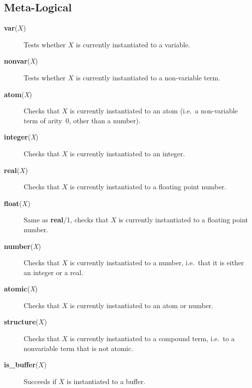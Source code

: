 \subsection{Meta-Logical}

\begin{description}

\item[{\bf var}($X$)] 
    Tests whether $X$ is currently instantiated to a variable.

\item[{\bf nonvar}({\em X})] 
    Tests whether $X$ is currently instantiated to a non-variable term.

\item[{\bf atom}({\em X})] 
    Checks that $X$ is currently instantiated to an atom
    (i.e.\ a non-variable term of arity~0, other than a number).

\item[{\bf integer}({\em X})] 
    Checks that $X$ is currently instantiated to an integer.

\item[{\bf real}($X$)] 
    Checks that $X$ is currently instantiated to a floating point number.

\item[{\bf float}($X$)] 
    Same as {\bf real}/1,
    checks that $X$ is currently instantiated to a floating point number.

\item[{\bf number}({\em X})] 
    Checks that $X$ is currently instantiated to a number,
    i.e.\ that it is either an integer or a real.

\item[{\bf atomic}({\em X})] 
    Checks that $X$ is currently instantiated to an atom or number.

\item[{\bf structure}($X$)] 
    Checks that $X$ is currently instantiated to a compound term,
    i.e.\ to a nonvariable term that is not atomic.

\item[{\bf is\_buffer}($X$)]
    Succeeds if $X$ is instantiated to a buffer.


\end{description}
